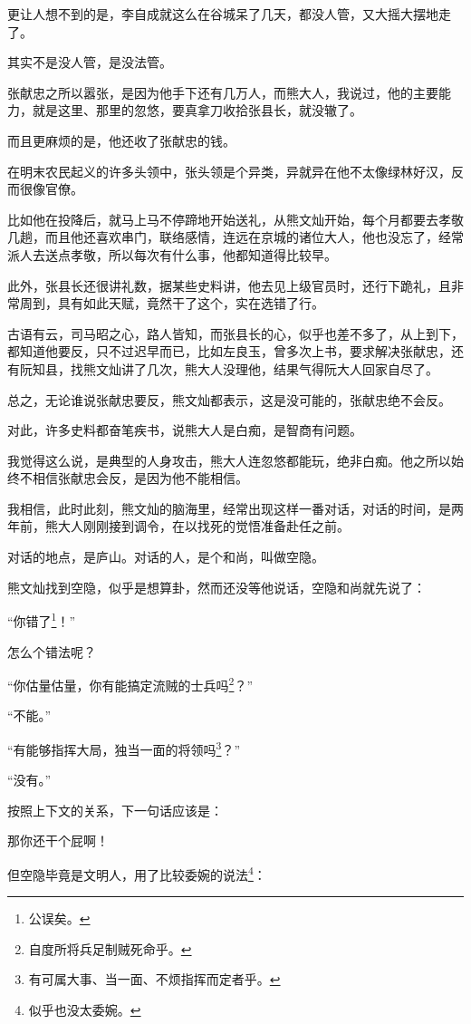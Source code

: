 \begin{multicols}{\theparacolNo}
		更让人想不到的是，李自成就这么在谷城呆了几天，都没人管，又大摇大摆地走了。

		其实不是没人管，是没法管。

		张献忠之所以嚣张，是因为他手下还有几万人，而熊大人，我说过，他的主要能力，就是这里、那里的忽悠，要真拿刀收拾张县长，就没辙了。

		而且更麻烦的是，他还收了张献忠的钱。

		在明末农民起义的许多头领中，张头领是个异类，异就异在他不太像绿林好汉，反而很像官僚。

		比如他在投降后，就马上马不停蹄地开始送礼，从熊文灿开始，每个月都要去孝敬几趟，而且他还喜欢串门，联络感情，连远在京城的诸位大人，他也没忘了，经常派人去送点孝敬，所以每次有什么事，他都知道得比较早。

		此外，张县长还很讲礼数，据某些史料讲，他去见上级官员时，还行下跪礼，且非常周到，具有如此天赋，竟然干了这个，实在选错了行。

		古语有云，司马昭之心，路人皆知，而张县长的心，似乎也差不多了，从上到下，都知道他要反，只不过迟早而已，比如左良玉，曾多次上书，要求解决张献忠，还有阮知县，找熊文灿讲了几次，熊大人没理他，结果气得阮大人回家自尽了。

		总之，无论谁说张献忠要反，熊文灿都表示，这是没可能的，张献忠绝不会反。

		对此，许多史料都奋笔疾书，说熊大人是白痴，是智商有问题。

		我觉得这么说，是典型的人身攻击，熊大人连忽悠都能玩，绝非白痴。他之所以始终不相信张献忠会反，是因为他不能相信。

		我相信，此时此刻，熊文灿的脑海里，经常出现这样一番对话，对话的时间，是两年前，熊大人刚刚接到调令，在以找死的觉悟准备赴任之前。

		对话的地点，是庐山。对话的人，是个和尚，叫做空隐。

		熊文灿找到空隐，似乎是想算卦，然而还没等他说话，空隐和尚就先说了：

		“你错了\footnote{公误矣。}！”

		怎么个错法呢？

		“你估量估量，你有能搞定流贼的士兵吗\footnote{自度所将兵足制贼死命乎。}？”

		“不能。”

		“有能够指挥大局，独当一面的将领吗\footnote{有可属大事、当一面、不烦指挥而定者乎。}？”

		“没有。”

		按照上下文的关系，下一句话应该是：

		那你还干个屁啊！

		但空隐毕竟是文明人，用了比较委婉的说法\footnote{似乎也没太委婉。}：


\end{multicols}
